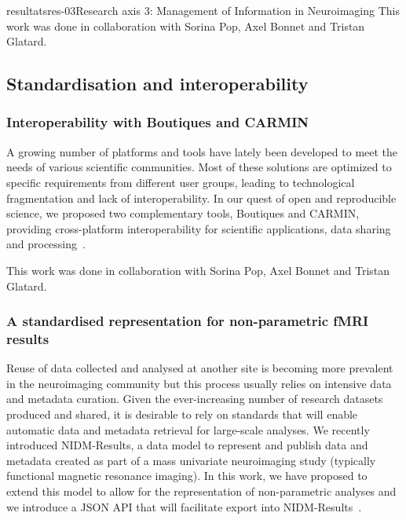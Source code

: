 \documentclass{ra2018}
\begin{document}
\begin{module}{resultats}{res-03}{Research axis 3: Management of Information in Neuroimaging}
This work was done in collaboration with Sorina Pop, Axel Bonnet and Tristan Glatard.

\subsection{Standardisation and interoperability}
\subsubsection{Interoperability with Boutiques and CARMIN}
\begin{participants}
\end{participants}
A growing number of platforms and tools have lately been developed to meet the needs of various scientific communities. Most of these solutions are optimized to specific requirements from different user groups, leading to technological fragmentation and lack of interoperability. In our quest of open and reproducible science, we proposed two complementary tools, Boutiques and CARMIN, providing cross-platform interoperability for scientific applications, data sharing and processing~\cite{pop:inserm-01846997}.

This work was done in collaboration with Sorina Pop, Axel Bonnet and Tristan Glatard.

\subsubsection{A standardised representation for non-parametric fMRI results}
\begin{participants}
\end{participants}
Reuse of data collected and analysed at another site is becoming more prevalent in the neuroimaging community but this process usually relies on intensive data and metadata curation. Given the ever-increasing number of research datasets produced and shared, it is desirable to rely on standards that will enable automatic data and metadata retrieval for large-scale analyses. We recently introduced NIDM-Results, a data model to represent and publish data and metadata created as part of a mass univariate neuroimaging study (typically functional magnetic resonance imaging). In this work, we have proposed to extend this model to allow for the representation of non-parametric analyses and we introduce a JSON API that will facilitate export into NIDM-Results~\cite{maumet:inserm-01828914}.


\end{module}
\end{document}
